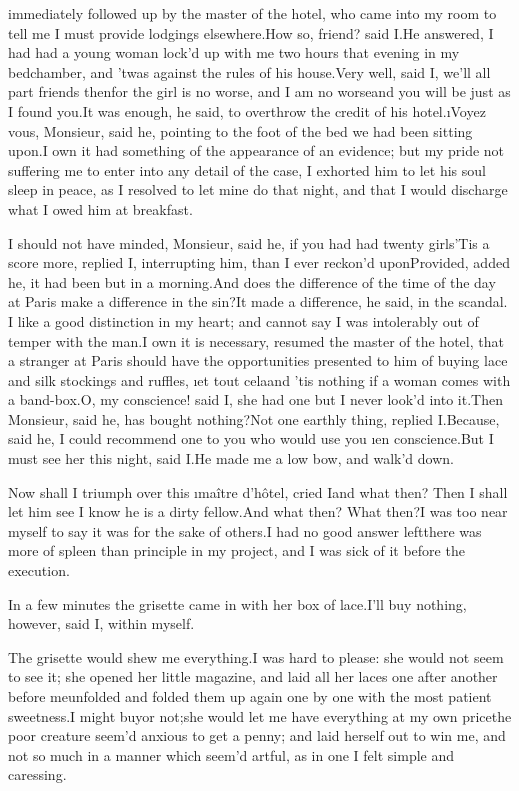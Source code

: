 \documentclass[twoside]{article}
\begin{document}
 immediately followed up
by the master of the hotel, who came into
my room to tell me I must provide lodgings
elsewhere.\tskk How so, friend?  said
I.\tskk He answered, I had had a young
woman lock’d up with me two hours that
evening in my bedchamber, and ’twas
against the rules of his house.\tskk Very
well, said I, we’ll all part friends
then\tskk for the girl is no worse,\tskk
and I am no worse\tskk and you will be
just as I found you.\tskk It was enough,
he said, to overthrow the credit of his
hotel.\tskk \i{Voyez vous}, Monsieur, said
he, pointing to the foot of the bed we had
been sitting upon.\tskk I own it had
something of the appearance of an
evidence; but my pride not suffering me to
enter into any detail of the case, I
exhorted him to let his soul sleep in
peace, as I resolved to let mine do that
night, and that I would discharge what I
owed him at breakfast.

I should not have minded, Monsieur, said
he, if you had had twenty girls\tskk ’Tis
a score more, replied I, interrupting him,
than I ever reckon’d upon\tskk Provided,
added he, it had been but in a
morning.\tskk And does the difference of
the time of the day at Paris make a
difference in the sin?\tskk It made a
difference, he said, in the scandal.\tskk
I like a good distinction in my heart; and
cannot say I was intolerably out of temper
with the man.\tskk I own it is necessary,
resumed the master of the hotel, that a
stranger at Paris should have the
opportunities presented to him of buying
lace and silk stockings and ruffles, \i{et
tout cela}\tskk and ’tis nothing if a
woman comes with a band-box.\tskk O, my
conscience! said I, she had one but I
never look’d into it.\tskk Then Monsieur,
said he, has bought nothing?\tskk Not one
earthly thing, replied I.\tskk Because,
said he, I could recommend one to you who
would use you \i{en conscience}.\tskk But
I must see her this night, said I.\tskk He
made me a low bow, and walk’d down.

Now shall I triumph over this \i{maître
d’hôtel}, cried I\tskk and what then?
Then I shall let him see I know he is a
dirty fellow.\tskk And what then?  What
then?\tskk I was too near myself to say it
was for the sake of others.\tskk I had no
good answer left\tskk there was more of
spleen than principle in my project, and I
was sick of it before the execution.

In a few minutes the grisette came in with
her box of lace.\tskk I’ll buy nothing,
however, said I, within myself.

The grisette would shew me
everything.\tskk I was hard to please: she
would not seem to see it; she opened her
little magazine, and laid all her laces
one after another before me\tskk unfolded
and folded them up again one by one with
the most patient sweetness.\tskk I might
buy\tskk or not;\tskk she would let me
have everything at my own price\tskk the
poor creature seem’d anxious to get a
penny; and laid herself out to win me, and
not so much in a manner which seem’d
artful, as in one I felt simple and
caressing.
\end{document}
